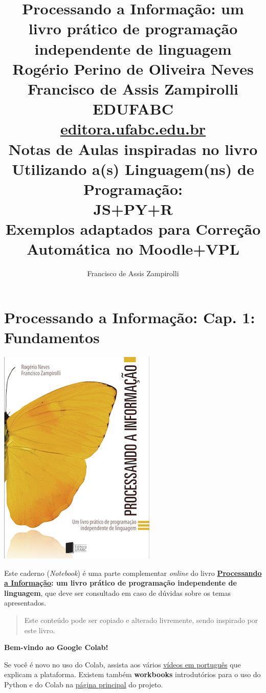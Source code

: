 \documentclass[12pt,a4paper]{article}
\title{Processando a Informação: um livro prático de programação independente de linguagem 
\\\large\vspace{2cm}
Rogério Perino de Oliveira Neves 
\\\vspace{5mm}
Francisco de Assis Zampirolli
\\\large\vspace{2cm}
EDUFABC
\\ \url{editora.ufabc.edu.br}
\\\Huge\vspace{3cm}
Notas de Aulas inspiradas no livro
\\\Large\vspace{1cm}
Utilizando a(s) Linguagem(ns) de Programação: 
\\\Huge\vspace{1cm}
JS+PY+R
\\\large\vspace{1cm}
Exemplos adaptados para Correção Automática no Moodle+VPL
\vspace{2cm}}
\author{Francisco de Assis Zampirolli\vspace{1cm}}
\begin{document}
    
    
\clearpage\maketitle
\thispagestyle{empty}
\tableofcontents

    
    

    
    \hypertarget{processando-a-informauxe7uxe3o-cap.-1-fundamentos}{%
\section{Processando a Informação: Cap. 1:
Fundamentos}\label{processando-a-informauxe7uxe3o-cap.-1-fundamentos}}

    \includegraphics{"figs/Capa_Processando_Informacao.jpg"}

Este caderno (\emph{Notebook}) é uma parte complementar \emph{online} do
livro
\textbf{\href{https://editora.ufabc.edu.br/matematica-e-ciencias-da-computacao/58-processando-a-informacao}{Processando
a Informação}: um livro prático de programação independente de
linguagem}, que deve ser consultado em caso de dúvidas sobre os temas
apresentados.

\begin{quote}
Este conteúdo pode ser copiado e alterado livremente, sendo inspirado
por este livro.
\end{quote}

    \textbf{Bem-vindo ao Google Colab!}

Se você é novo no uso do Colab, assista aos vários
\href{https://www.youtube.com/results?search_query=introdu\%C3\%A7\%C3\%A3o+ao+colab}{vídeos
em português} que explicam a plataforma. Existem também
\textbf{workbooks} introdutórios para o uso do Python e do Colab na
\href{https://colab.research.google.com/}{página principal} do projeto.
\end{document}
